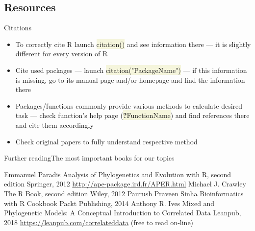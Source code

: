 \documentclass[compress, ucs, xelatex, 11pt, xcolor=svgnames, aspectratio=169,
	hyperref={
		bookmarks=true,
		unicode=true,
		colorlinks=true,
		pdftitle={Molecular data in R},
		plainpages=false,
		pdfauthor={Vojtech Zeisek},
		pdfsubject={Course about phylogeny and evolution in R},
		pdfcreator={XeLaTeX},
		pdfkeywords={R, evolution, phylogeny, molecular data},
		linkcolor=Crimson, %
		anchorcolor=Magenta, %
		citecolor=Magenta, %
		filecolor=Magenta, %
		menucolor=Magenta, %
		urlcolor=DodgerBlue, %
		pdftex},
	url={hyphens, lowtilde} %
	]{beamer}
\renewcommand{\texttt}[1]{\colorbox{Beige}{{\ttfamily #1}}}
\begin{document}
\subsection{Resources}

\begin{frame}{Citations}
	\begin{itemize}
		\item To correctly cite R launch \texttt{citation()} and see information there --- it is slightly different for every version of R
		\item Cite used packages --- launch \texttt{citation("PackageName")} --- if this information is missing, go to its manual page and/or homepage and find the information there
		\item Packages/functions commonly provide various methods to calculate desired task --- check function's help page (\texttt{\textbf{?}FunctionName}) and find references there and cite them accordingly
		\item Check original papers to fully understand respective method
	\end{itemize}
\end{frame}

\begin{frame}{Further reading}{The most important books for our topics}
	\begin{multicols}{2}
		\begin{thebibliography}{1}
				Emmanuel Paradis
				\newblock Analysis of Phylogenetics and Evolution with R, second edition
				\newblock Springer, 2012
				\newblock \url{http://ape-package.ird.fr/APER.html}
				Michael J. Crawley
				\newblock The R Book, second edition
				\newblock Wiley, 2012
				Paurush Praveen Sinha
				\newblock Bioinformatics with R Cookbook
				\newblock Packt Publishing, 2014
				Anthony R. Ives
				\newblock Mixed and Phylogenetic Models: A Conceptual Introduction to Correlated Data
				\newblock Leanpub, 2018
				\newblock \url{https://leanpub.com/correlateddata} (free to read on-line)
		\end{thebibliography}
	\end{multicols}
\end{frame}
\end{document}

